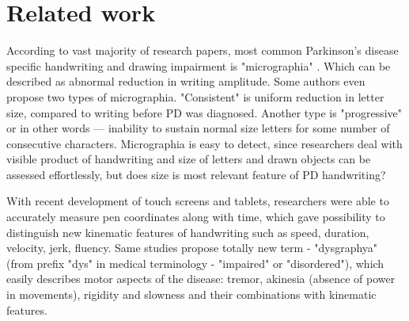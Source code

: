 \section{Related work}


% 
% 


According to vast majority of research papers, most common Parkinson's disease specific handwriting and drawing impairment is "micrographia" \cite{shukla2012micrographia, van2001parkinsonian}. Which can be described as abnormal reduction in writing amplitude. Some authors \cite{letanneux2014micrographia, pinto2015handwriting} even propose two types of micrographia. "Consistent" is uniform reduction in letter size, compared to writing before PD was diagnosed. Another type is "progressive" or in other words --- inability to sustain normal size letters for some number of consecutive characters. Micrographia is easy to detect, since researchers deal with visible product of handwriting and size of letters and drawn objects can be assessed effortlessly, but does size is most relevant feature of PD handwriting? 

With recent development of touch screens and tablets, researchers were able to accurately measure pen coordinates along with time, which gave possibility to distinguish new kinematic features of handwriting such as speed, duration, velocity, jerk, fluency. Same studies propose totally new term - "dysgraphya" \cite{letanneux2014micrographia} (from prefix "dys" in medical terminology - "impaired" or "disordered"), which easily describes motor aspects of the disease: tremor, akinesia (absence of power in movements), rigidity and slowness and their combinations with kinematic features.

% 
% 

